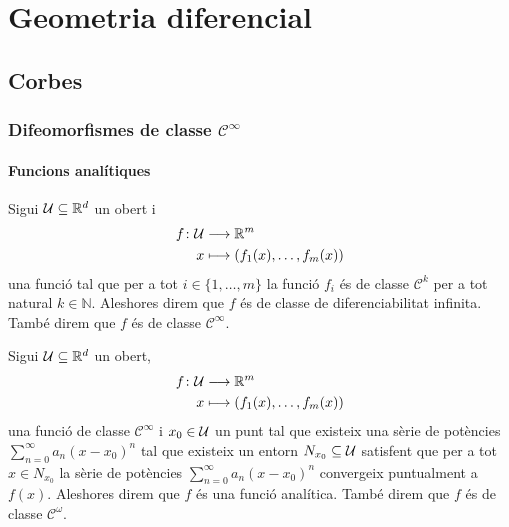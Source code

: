 \documentclass[../Apunts.tex]{subfiles}
\begin{document}
\part{Geometria diferencial}
\chapter{Corbes}
\section{Difeomorfismes de classe \ensuremath{\mathcal{C}^{\infty}}}
	\subsection{Funcions analítiques}
	\begin{definition}
		\label{def:classe de diferenciabilitat infinita}
		Sigui \(\mathcal{U}\subseteq\mathbb{R}^{d}\) un obert i
		\begin{align*}
			f\colon\mathcal{U}&\longrightarrow\mathbb{R}^{m} \\
			x&\longmapsto(f_{1}(x),\dots,f_{m}(x))
		\end{align*}
		una funció tal que per a tot \(i\in\{1,\dots,m\}\) la funció \(f_{i}\) és de classe \(\mathcal{C}^{k}\) per a tot natural \(k\in\mathbb{N}\). Aleshores direm que \(f\) és de classe de diferenciabilitat infinita. També direm que \(f\) és de classe \(\mathcal{C}^{\infty}\).
	\end{definition}
	\begin{definition}
		\label{def:funció analítica}
		Sigui \(\mathcal{U}\subseteq\mathbb{R}^{d}\) un obert,
		\begin{align*}
			f\colon\mathcal{U}&\longrightarrow\mathbb{R}^{m} \\
			x&\longmapsto(f_{1}(x),\dots,f_{m}(x))
		\end{align*}
		una funció de classe \(\mathcal{C}^{\infty}\) i \(x_{0}\in\mathcal{U}\) un punt tal que existeix una sèrie de potències \(\sum_{n=0}^{\infty}a_{n}(x-x_{0})^{n}\) tal que existeix un entorn \(N_{x_{0}}\subseteq\mathcal{U}\) satisfent que per a tot \(x\in N_{x_{0}}\) la sèrie de potències \(\sum_{n=0}^{\infty}a_{n}(x-x_{0})^{n}\) convergeix puntualment a \(f(x)\). Aleshores direm que \(f\) és una funció analítica. També direm que \(f\) és de classe \(\mathcal{C}^{\omega}\).
	\end{definition}
\end{document}
